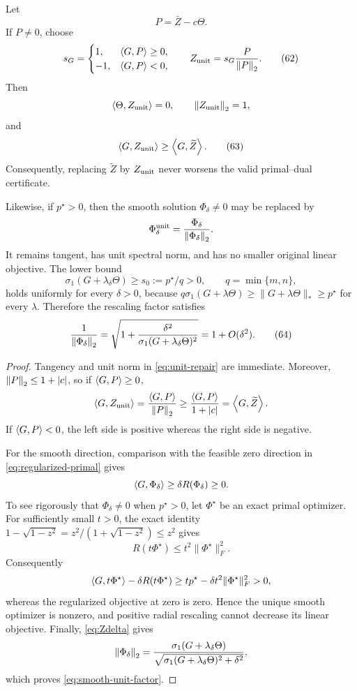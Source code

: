 \begin{corollary}
\label{cor:unit-repair}
Let
\[
P=\bar Z-c\Theta.
\]
If \(P\ne0\), choose
\begin{equation}
s_G=
\begin{cases}
1,&\left\langle G,P\right\rangle\ge0,\\
-1,&\left\langle G,P\right\rangle<0,
\end{cases}
\qquad
Z_{\rm unit}=s_G\frac{P}{\left\lVert P\right\rVert_{2}}.
\tag{62}
\label{eq:unit-repair}
\end{equation}
Then
\[
\left\langle \Theta,Z_{\rm unit}\right\rangle=0,\qquad
\left\lVert Z_{\rm unit}\right\rVert_{2}=1,
\]
and
\begin{equation}
\left\langle G,Z_{\rm unit}\right\rangle\ge\left\langle G,\widetilde Z\right\rangle.
\tag{63}
\label{eq:unit-repair-objective}
\end{equation}
Consequently, replacing \(\widetilde Z\) by \(Z_{\rm unit}\) never worsens the
valid primal--dual certificate.

Likewise, if \(p^\star>0\), then the smooth solution
\(\Phi_\delta\ne0\) may be replaced by
\[
\Phi_\delta^{\rm unit}
=\frac{\Phi_\delta}{\left\lVert \Phi_\delta\right\rVert_{2}}.
\]
It remains tangent, has unit spectral norm, and has no smaller original
linear objective.  The lower bound
\[
\sigma_1(G+\lambda_\delta\Theta)\ge s_0:=p^\star/q>0,
\qquad q=\min\{m,n\},
\]
holds uniformly for every \(\delta>0\), because
\(q\sigma_1(G+\lambda\Theta)\ge\|G+\lambda\Theta\|_*\ge p^\star\)
for every \(\lambda\).  Therefore the rescaling factor satisfies
\begin{equation}
\frac{1}{\left\lVert \Phi_\delta\right\rVert_{2}}
=
\sqrt{1+\frac{\delta^2}
{\sigma_1(G+\lambda_\delta\Theta)^2}}
=1+O(\delta^2).
\tag{64}
\label{eq:smooth-unit-factor}
\end{equation}
\end{corollary}

\begin{proof}
Tangency and unit norm in \eqref{eq:unit-repair} are immediate.  Moreover,
\(\left\lVert P\right\rVert_{2}\le1+|c|\), so if \(\left\langle G,P\right\rangle\ge0\),
\[
\left\langle G,Z_{\rm unit}\right\rangle
=\frac{\left\langle G,P\right\rangle}{\left\lVert P\right\rVert_{2}}
\ge\frac{\left\langle G,P\right\rangle}{1+|c|}
=\left\langle G,\widetilde Z\right\rangle.
\]
If \(\left\langle G,P\right\rangle<0\), the left side is positive whereas the right side is
negative.

For the smooth direction, comparison with the feasible zero direction in
\eqref{eq:regularized-primal} gives
\[
\left\langle G,\Phi_\delta\right\rangle
\ge\delta R(\Phi_\delta)\ge0.
\]
To see rigorously that \(\Phi_\delta\ne0\) when \(p^\star>0\), let
\(\Phi^\star\) be an exact primal optimizer.  For sufficiently small
\(t>0\), the exact identity
\(1-\sqrt{1-z^2}=z^2/(1+\sqrt{1-z^2})\le z^2\) gives
\[
 R(t\Phi^\star)\le t^2\|\Phi^\star\|_F^2.
\]
Consequently
\[
 \left\langle G,t\Phi^\star\right\rangle-\delta R(t\Phi^\star)
 \ge tp^\star-\delta t^2\|\Phi^\star\|_F^2>0,
\]
whereas the regularized objective at zero is zero.  Hence the unique smooth
optimizer is nonzero, and positive radial rescaling cannot decrease its
linear objective.  Finally,
\eqref{eq:Zdelta} gives
\[
\left\lVert \Phi_\delta\right\rVert_{2}
=
\frac{\sigma_1(G+\lambda_\delta\Theta)}
{\sqrt{\sigma_1(G+\lambda_\delta\Theta)^2+\delta^2}},
\]
which proves \eqref{eq:smooth-unit-factor}.
\end{proof}

